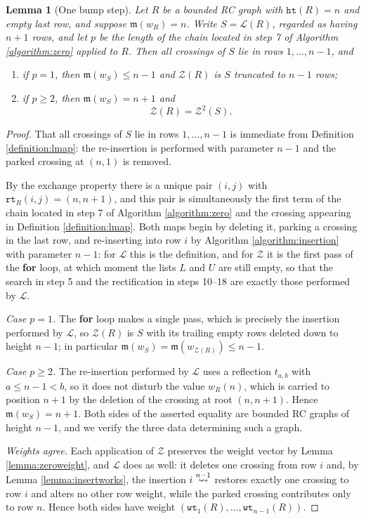 \documentclass{amsart}
\newtheorem{lemma}{Lemma}[subsection]
\theoremstyle{definition}
\theoremstyle{remark}
\numberwithin{equation}{subsection}
\newcommand{\wof}[1]{w_{#1}}
\newcommand{\wtt}{\mathtt{wt}}
\newcommand{\rtt}{\mathtt{rt}}
\newcommand{\zeromap}{\mathcal{Z}}
\newcommand{\hr}{\mathtt{ht}}
\newcommand{\lmap}{\mathscr{L}}
\newcommand{\maxd}{\mathfrak{m}}
\begin{document}
\begin{lemma}[One bump step]\label{lemma:bumpstep}
Let $R$ be a bounded RC graph with $\hr(R)=n$ and empty last row, and suppose $\maxd(\wof R)=n$. Write $S=\lmap(R)$, regarded as having $n+1$ rows, and let $p$ be the length of the chain located in step 7 of Algorithm \ref{algorithm:zero} applied to $R$. Then all crossings of $S$ lie in rows $1,\ldots,n-1$, and
\begin{enumerate}
\item if $p=1$, then $\maxd(\wof S)\leq n-1$ and $\zeromap(R)$ is $S$ truncated to $n-1$ rows;
\item if $p\geq 2$, then $\maxd(\wof S)=n+1$ and
$$\zeromap(R)=\zeromap^{2}(S).$$
\end{enumerate}
\end{lemma}
\begin{proof}
That all crossings of $S$ lie in rows $1,\ldots,n-1$ is immediate from Definition \ref{definition:lmap}: the re-insertion is performed with parameter $n-1$ and the parked crossing at $(n,1)$ is removed.

By the exchange property there is a unique pair $(i,j)$ with $\rtt_R(i,j)=(n,n+1)$, and this pair is simultaneously the first term of the chain located in step 7 of Algorithm \ref{algorithm:zero} and the crossing appearing in Definition \ref{definition:lmap}. Both maps begin by deleting it, parking a crossing in the last row, and re-inserting into row $i$ by Algorithm \ref{algorithm:insertion} with parameter $n-1$: for $\lmap$ this is the definition, and for $\zeromap$ it is the first pass of the \textbf{for} loop, at which moment the lists $L$ and $U$ are still empty, so that the search in step 5 and the rectification in steps 10--18 are exactly those performed by $\lmap$.

\emph{Case $p=1$.} The \textbf{for} loop makes a single pass, which is precisely the insertion performed by $\lmap$, so $\zeromap(R)$ is $S$ with its trailing empty rows deleted down to height $n-1$; in particular $\maxd(\wof S)=\maxd(\wof{\zeromap(R)})\leq n-1$.

\emph{Case $p\geq 2$.} The re-insertion performed by $\lmap$ uses a reflection $t_{a,b}$ with $a\leq n-1<b$, so it does not disturb the value $\wof R(n)$, which is carried to position $n+1$ by the deletion of the crossing at root $(n,n+1)$. Hence $\maxd(\wof S)=n+1$. Both sides of the asserted equality are bounded RC graphs of height $n-1$, and we verify the three data determining such a graph.

\emph{Weights agree.} Each application of $\zeromap$ preserves the weight vector by Lemma \ref{lemma:zeroweight}, and $\lmap$ does as well: it deletes one crossing from row $i$ and, by Lemma \ref{lemma:insertworks}, the insertion $\ins{n-1}{i}$ restores exactly one crossing to row $i$ and alters no other row weight, while the parked crossing contributes only to row $n$. Hence both sides have weight $(\wtt_1(R),\ldots,\wtt_{n-1}(R))$.


\end{proof}
\end{document}
